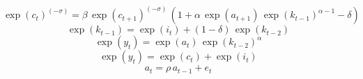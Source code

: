 \begin{dmath}
\exp\left({c}_{t}\right)^{\left(-{\sigma}\right)}={\beta}\, \exp\left({c}_{t+1}\right)^{\left(-{\sigma}\right)}\, \left(1+{\alpha}\, \exp\left({a}_{t+1}\right)\, \exp\left({k}_{t-1}\right)^{{\alpha}-1}-{\delta}\right)
\end{dmath}
\begin{dmath}
\exp\left({k}_{t-1}\right)=\exp\left({i}_{t}\right)+\left(1-{\delta}\right)\, \exp\left({k}_{t-2}\right)
\end{dmath}
\begin{dmath}
\exp\left({y}_{t}\right)=\exp\left({a}_{t}\right)\, \exp\left({k}_{t-2}\right)^{{\alpha}}
\end{dmath}
\begin{dmath}
\exp\left({y}_{t}\right)=\exp\left({c}_{t}\right)+\exp\left({i}_{t}\right)
\end{dmath}
\begin{dmath}
{a}_{t}={\rho}\, {a}_{t-1}+{e}_{t}
\end{dmath}
